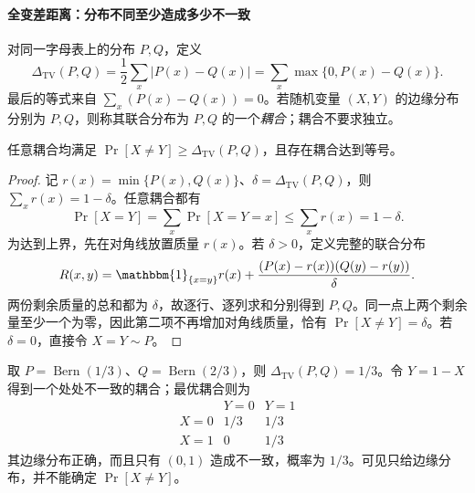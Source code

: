 \documentclass[lang=cn,a4paper,fontset=none,zihao=false,10pt,openany,twoside]{beautybook}
\numberwithin{algorithm}{chapter}
\begin{document}
\paragraph{全变差距离：分布不同至少造成多少不一致}
\begin{definition}[全变差距离与耦合]\label{def:total-variation}
对同一字母表上的分布 $P,Q$，定义
\[
 \Delta_{\mathrm{TV}}(P,Q)=\frac12\sum_x|P(x)-Q(x)|
 =\sum_x\max\{0,P(x)-Q(x)\}.
\]
最后的等式来自 $\sum_x(P(x)-Q(x))=0$。若随机变量 $(X,Y)$ 的边缘分布分别为 $P,Q$，则称其联合分布为 $P,Q$ 的一个\emph{耦合}；耦合不要求独立。
\end{definition}
\begin{proposition}[最优耦合]\label{prop:optimal-coupling}
任意耦合均满足 $\Pr[X\ne Y]\ge\Delta_{\mathrm{TV}}(P,Q)$，且存在耦合达到等号。
\end{proposition}
\begin{proof}
记 $r(x)=\min\{P(x),Q(x)\}$、$\delta=\Delta_{\mathrm{TV}}(P,Q)$，则
$\sum_xr(x)=1-\delta$。任意耦合都有
\[
 \Pr[X=Y]=\sum_x\Pr[X=Y=x]\le\sum_xr(x)=1-\delta.
\]
为达到上界，先在对角线放置质量 $r(x)$。若 $\delta>0$，定义完整的联合分布
\[
 R(x,y)=\mathbbm{1}_{\{x=y\}}r(x)
 +\frac{(P(x)-r(x))(Q(y)-r(y))}{\delta}.
\]
两份剩余质量的总和都为 $\delta$，故逐行、逐列求和分别得到 $P,Q$。同一点上两个剩余量至少一个为零，因此第二项不再增加对角线质量，恰有 $\Pr[X\ne Y]=\delta$。若 $\delta=0$，直接令 $X=Y\sim P$。
\end{proof}
\begin{example}
取 $P=\operatorname{Bern}(1/3)$、$Q=\operatorname{Bern}(2/3)$，则 $\Delta_{\mathrm{TV}}(P,Q)=1/3$。令 $Y=1-X$ 得到一个处处不一致的耦合；最优耦合则为
\[
 \begin{array}{c|cc}
 &Y=0&Y=1\\\hline
 X=0&1/3&1/3\\
 X=1&0&1/3
 \end{array}
\]
其边缘分布正确，而且只有 $(0,1)$ 造成不一致，概率为 $1/3$。可见只给边缘分布，并不能确定 $\Pr[X\ne Y]$。
\end{example}
\end{document}
